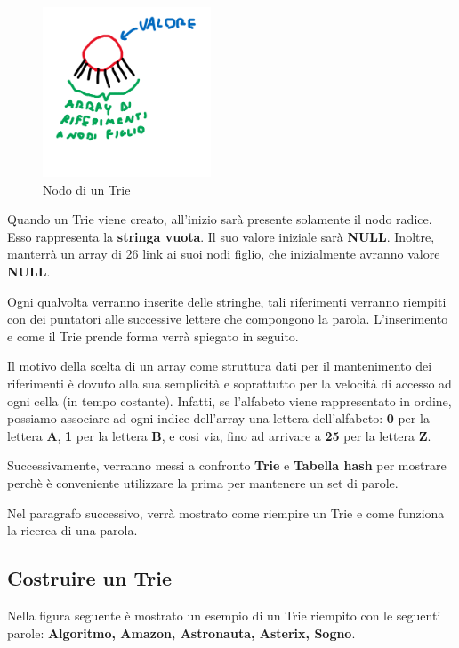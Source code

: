 \documentclass[a4paper, 12pt]{article}
\begin{document}
\begin{figure}[ht!]
    \centering
    \includegraphics[width=5cm]{Images/nodo trie.png}
    \caption{Nodo di un Trie}
    \label{fig:my_label}
\end{figure}

Quando un Trie viene creato, all'inizio sarà presente solamente il nodo radice. Esso rappresenta la \textbf{stringa vuota}. Il suo valore iniziale sarà \textbf{NULL}. Inoltre, manterrà un array di 26 link ai suoi nodi figlio, che inizialmente avranno valore \textbf{NULL}.

Ogni qualvolta verranno inserite delle stringhe, tali riferimenti verranno riempiti con dei puntatori alle successive lettere che compongono la parola. L'inserimento e come il Trie prende forma verrà spiegato in seguito.

Il motivo della scelta di un array come struttura dati per il mantenimento dei riferimenti è dovuto alla sua semplicità e soprattutto per la velocità di accesso ad ogni cella (in tempo costante). Infatti, se l'alfabeto viene rappresentato in ordine, possiamo associare ad ogni indice dell'array una lettera dell'alfabeto: \textbf{0} per la lettera \textbf{A}, \textbf{1} per la lettera \textbf{B}, e cosi via, fino ad arrivare a \textbf{25} per la lettera \textbf{Z}.

Successivamente, verranno messi a confronto \textbf{Trie} e \textbf{Tabella hash} per mostrare perchè è conveniente utilizzare la prima per mantenere un set di parole.

Nel paragrafo successivo, verrà mostrato come riempire un Trie e come funziona la ricerca di una parola.

\subsection{Costruire un Trie}
Nella figura seguente è mostrato un esempio di un Trie riempito con le seguenti parole: \textbf{Algoritmo, Amazon, Astronauta, Asterix, Sogno}.
\end{document}
